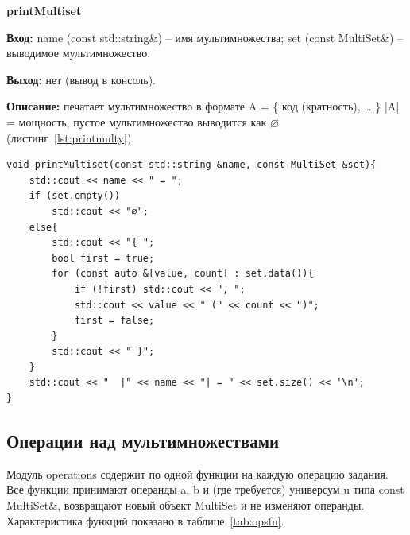 \documentclass[14pt,a4paper]{extreport}
\newcommand{\code}[1]{{\ttfamily #1}}
\begin{document}
\textbf{printMultiset}

\textbf{Вход:} \code{name} (\code{const std::string\&}) -- имя мультимножества; \code{set} (\code{const MultiSet\&}) -- выводимое мультимножество.

\textbf{Выход:} нет (вывод в консоль).

\textbf{Описание:} печатает мультимножество в формате \code{A = \{ код (кратность), \ldots{} \}  |A| = мощность}; пустое мультимножество выводится как $\varnothing$ (листинг~\ref{lst:printmulty}).

\begin{listing}[H]
\caption{Функция \code{printMultiset} (input.cpp)}\label{lst:printmulty}
\begin{lstlisting}
void printMultiset(const std::string &name, const MultiSet &set){
    std::cout << name << " = ";
    if (set.empty())
        std::cout << "∅";
    else{
        std::cout << "{ ";
        bool first = true;
        for (const auto &[value, count] : set.data()){
            if (!first) std::cout << ", ";
            std::cout << value << " (" << count << ")";
            first = false;
        }
        std::cout << " }";
    }
    std::cout << "  |" << name << "| = " << set.size() << '\n';
}
\end{lstlisting}
\end{listing}

\subsection{Операции над мультимножествами}

Модуль \code{operations} содержит по одной функции на каждую операцию задания. Все функции принимают операнды \code{a}, \code{b} и (где требуется) универсум \code{u} типа \code{const MultiSet\&}, возвращают новый объект \code{MultiSet} и не изменяют операнды. Характеристика функций показано в таблице~\ref{tab:opsfn}.
\end{document}
